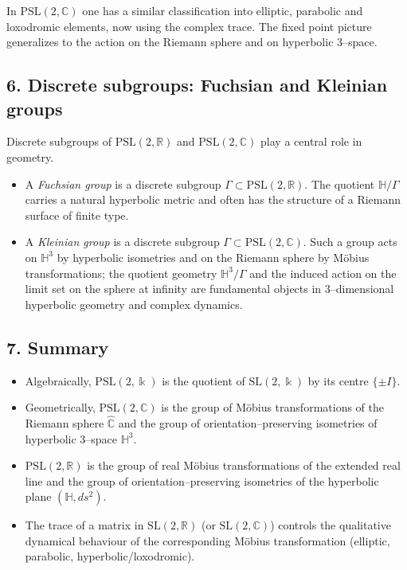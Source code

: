 \documentclass[12pt,a4paper]{article}
\theoremstyle{plain}
\theoremstyle{definition}      %
\begin{document}
In $\mathrm{PSL}(2,\mathbb{C})$ one has a similar classification into
elliptic, parabolic and loxodromic elements, now using the complex trace.
The fixed point picture generalizes to the action on the Riemann sphere and
on hyperbolic $3$--space.

\subsection*{6. Discrete subgroups: Fuchsian and Kleinian groups}

Discrete subgroups of $\mathrm{PSL}(2,\mathbb{R})$ and
$\mathrm{PSL}(2,\mathbb{C})$ play a central role in geometry.

\begin{itemize}
	\item A \emph{Fuchsian group} is a discrete subgroup
	$\Gamma\subset\mathrm{PSL}(2,\mathbb{R})$.  The quotient
	$\mathbb{H}/\Gamma$ carries a natural hyperbolic metric and often
	has the structure of a Riemann surface of finite type.
	\item A \emph{Kleinian group} is a discrete subgroup
	$\Gamma\subset\mathrm{PSL}(2,\mathbb{C})$.  Such a group acts on
	$\mathbb{H}^{3}$ by hyperbolic isometries and on the Riemann sphere
	by Möbius transformations; the quotient geometry
	$\mathbb{H}^{3}/\Gamma$ and the induced action on the limit set on
	the sphere at infinity are fundamental objects in $3$--dimensional
	hyperbolic geometry and complex dynamics.
\end{itemize}

\subsection*{7. Summary}

\begin{itemize}
	\item Algebraically, $\mathrm{PSL}(2,\Bbbk)$ is the quotient of
	$\mathrm{SL}(2,\Bbbk)$ by its centre $\{\pm I\}$.
	\item Geometrically, $\mathrm{PSL}(2,\mathbb{C})$ is the group of Möbius
	transformations of the Riemann sphere $\widehat{\mathbb{C}}$ and
	the group of orientation–preserving isometries of hyperbolic
	$3$--space $\mathbb{H}^{3}$.
	\item $\mathrm{PSL}(2,\mathbb{R})$ is the group of real Möbius
	transformations of the extended real line and the group of
	orientation–preserving isometries of the hyperbolic plane
	$(\mathbb{H},ds^{2})$.
	\item The trace of a matrix in $\mathrm{SL}(2,\mathbb{R})$ (or
	$\mathrm{SL}(2,\mathbb{C})$) controls the qualitative dynamical
	behaviour of the corresponding Möbius transformation (elliptic,
	parabolic, hyperbolic/loxodromic).
\end{itemize}
\end{document}
